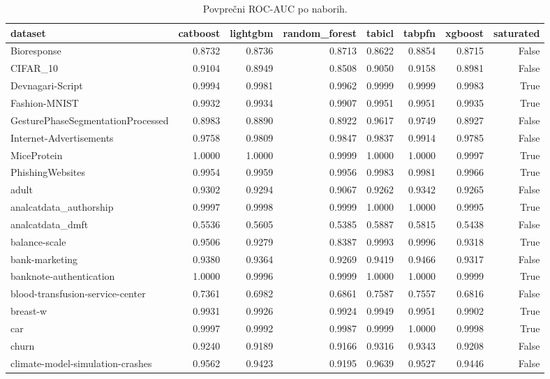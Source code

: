 \begin{table}[htbp]
\centering
\caption{Povprečni ROC-AUC po naborih.}
\label{tab:pivot}
\begin{tabular}{lrrrrrrr}
\hline
dataset & catboost & lightgbm & random\_forest & tabicl & tabpfn & xgboost & saturated \\
\hline
Bioresponse & 0.8732 & 0.8736 & 0.8713 & 0.8622 & 0.8854 & 0.8715 & False \\
CIFAR\_10 & 0.9104 & 0.8949 & 0.8508 & 0.9050 & 0.9158 & 0.8981 & False \\
Devnagari-Script & 0.9994 & 0.9981 & 0.9962 & 0.9999 & 0.9999 & 0.9983 & True \\
Fashion-MNIST & 0.9932 & 0.9934 & 0.9907 & 0.9951 & 0.9951 & 0.9935 & True \\
GesturePhaseSegmentationProcessed & 0.8983 & 0.8890 & 0.8922 & 0.9617 & 0.9749 & 0.8927 & False \\
Internet-Advertisements & 0.9758 & 0.9809 & 0.9847 & 0.9837 & 0.9914 & 0.9785 & False \\
MiceProtein & 1.0000 & 1.0000 & 0.9999 & 1.0000 & 1.0000 & 0.9997 & True \\
PhishingWebsites & 0.9954 & 0.9959 & 0.9956 & 0.9983 & 0.9981 & 0.9966 & True \\
adult & 0.9302 & 0.9294 & 0.9067 & 0.9262 & 0.9342 & 0.9265 & False \\
analcatdata\_authorship & 0.9997 & 0.9998 & 0.9999 & 1.0000 & 1.0000 & 0.9995 & True \\
analcatdata\_dmft & 0.5536 & 0.5605 & 0.5385 & 0.5887 & 0.5815 & 0.5438 & False \\
balance-scale & 0.9506 & 0.9279 & 0.8387 & 0.9993 & 0.9996 & 0.9318 & True \\
bank-marketing & 0.9380 & 0.9364 & 0.9269 & 0.9419 & 0.9466 & 0.9317 & False \\
banknote-authentication & 1.0000 & 0.9996 & 0.9999 & 1.0000 & 1.0000 & 0.9999 & True \\
blood-transfusion-service-center & 0.7361 & 0.6982 & 0.6861 & 0.7587 & 0.7557 & 0.6816 & False \\
breast-w & 0.9931 & 0.9926 & 0.9924 & 0.9949 & 0.9951 & 0.9902 & True \\
car & 0.9997 & 0.9992 & 0.9987 & 0.9999 & 1.0000 & 0.9998 & True \\
churn & 0.9240 & 0.9189 & 0.9166 & 0.9316 & 0.9343 & 0.9208 & False \\
climate-model-simulation-crashes & 0.9562 & 0.9423 & 0.9195 & 0.9639 & 0.9527 & 0.9446 & False \\

\end{tabular}
\end{table}
